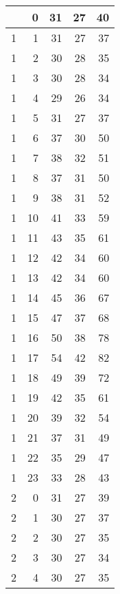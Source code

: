     \begin{longtable}{|r|r|r|r|r|}
		\centering
    1     & 0     & 31    & 27    & 40 \\\hline
    1     & 1     & 31    & 27    & 37 \\\hline
    1     & 2     & 30    & 28    & 35 \\\hline
    1     & 3     & 30    & 28    & 34 \\\hline
    1     & 4     & 29    & 26    & 34 \\\hline
    1     & 5     & 31    & 27    & 37 \\\hline
    1     & 6     & 37    & 30    & 50 \\\hline
    1     & 7     & 38    & 32    & 51 \\\hline
    1     & 8     & 37    & 31    & 50 \\\hline
    1     & 9     & 38    & 31    & 52 \\\hline
    1     & 10    & 41    & 33    & 59 \\\hline
    1     & 11    & 43    & 35    & 61 \\\hline
    1     & 12    & 42    & 34    & 60 \\\hline
    1     & 13    & 42    & 34    & 60 \\\hline
    1     & 14    & 45    & 36    & 67 \\\hline
    1     & 15    & 47    & 37    & 68 \\\hline
    1     & 16    & 50    & 38    & 78 \\\hline
    1     & 17    & 54    & 42    & 82 \\\hline
    1     & 18    & 49    & 39    & 72 \\\hline
    1     & 19    & 42    & 35    & 61 \\\hline
    1     & 20    & 39    & 32    & 54 \\\hline
    1     & 21    & 37    & 31    & 49 \\\hline
    1     & 22    & 35    & 29    & 47 \\\hline
    1     & 23    & 33    & 28    & 43 \\\hline
    2     & 0     & 31    & 27    & 39 \\\hline
    2     & 1     & 30    & 27    & 37 \\\hline
    2     & 2     & 30    & 27    & 35 \\\hline
    2     & 3     & 30    & 27    & 34 \\\hline
    2     & 4     & 30    & 27    & 35 \\\hline

\end{longtable}
